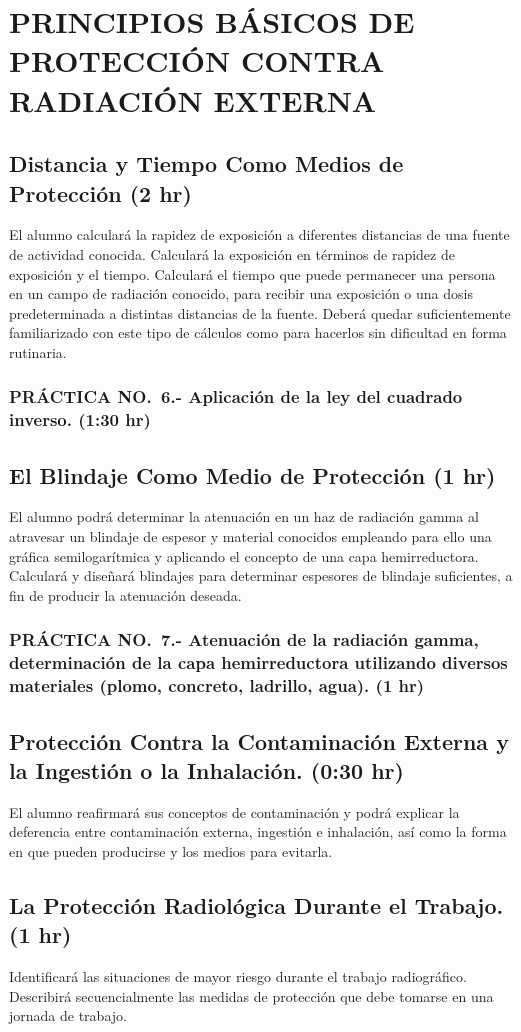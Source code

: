 \section{PRINCIPIOS BÁSICOS DE PROTECCIÓN CONTRA RADIACIÓN EXTERNA}

\subsection{Distancia y Tiempo Como Medios de Protección (2 hr)}

El alumno calculará la rapidez de exposición a diferentes distancias de una fuente de actividad conocida. Calculará la exposición en términos de rapidez de exposición y el tiempo. Calculará el tiempo que puede permanecer una persona en un campo de radiación conocido, para recibir una exposición o una dosis predeterminada a distintas distancias de la fuente. Deberá quedar suficientemente familiarizado con este tipo de cálculos como para hacerlos sin dificultad en forma rutinaria.

\subsubsection{PRÁCTICA NO.~6.- Aplicación de la ley del cuadrado inverso. (1:30 hr)}

\subsection{El Blindaje Como Medio de Protección (1 hr)}

El alumno podrá determinar la atenuación en un haz de radiación gamma al atravesar un blindaje de espesor y material conocidos empleando para ello una gráfica semilogarítmica y aplicando el concepto de una capa hemirreductora. Calculará y diseñará blindajes para determinar espesores de blindaje suficientes, a fin de producir la atenuación deseada.

\subsubsection{PRÁCTICA NO.~7.- Atenuación de la radiación gamma, determinación de la capa hemirreductora utilizando diversos materiales (plomo, concreto, ladrillo, agua). (1 hr)}

\subsection{Protección Contra la Contaminación Externa y la Ingestión o la Inhalación. (0:30 hr)}

El alumno reafirmará sus conceptos de contaminación y podrá explicar la deferencia entre contaminación externa, ingestión e inhalación, así como la forma en que pueden producirse y los medios para evitarla.

\subsection{La Protección Radiológica Durante el Trabajo. (1 hr)}

Identificará las situaciones de mayor riesgo durante el trabajo radiográfico. Describirá secuencialmente las medidas de protección que debe tomarse en una jornada de trabajo.